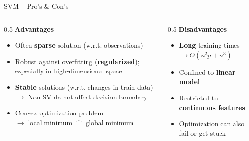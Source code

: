\documentclass[11pt,compress,t,notes=noshow, xcolor=table]{beamer}
\begin{document}
\begin{vbframe}{SVM -- Pro's \& Con's}

\begin{columns}[T, totalwidth=\textwidth]
  \begin{column}{0.5\textwidth}
    \textbf{Advantages}
    \normalsize
    \begin{itemize}
      \item Often \textbf{sparse} solution (w.r.t. observations)
      \item Robust against overfitting (\textbf{regularized}); especially in 
      high-dimensional space
      \item \textbf{Stable} solutions (w.r.t. changes in train data)\\
      $\rightarrow$ Non-SV do not affect decision boundary
      \item Convex optimization problem \\
      $\rightarrow$ local minimum $\hat{=}$ global minimum
    \end{itemize}
    
  \end{column}

  \begin{column}{0.5\textwidth}
    \textbf{Disadvantages}
    \normalsize
    \begin{itemize}
      \item \textbf{Long} training times $\rightarrow O(n^2 p + n^3)$
      \item Confined to \textbf{linear model}
      \item Restricted to \textbf{continuous features}
      \item Optimization can also fail or get stuck
    \end{itemize}


\end{column}
\end{columns}
\end{vbframe}
\end{document}
